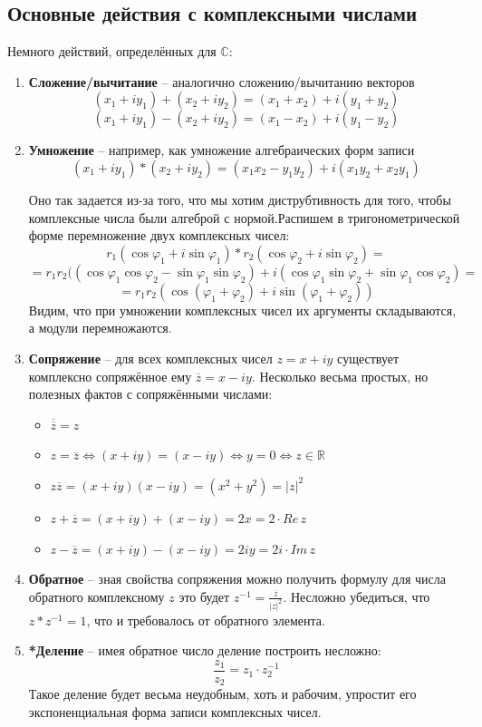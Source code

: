\documentclass[twoside]{book}
\begin{document}
\subsection{Основные действия с комплексными числами}
Немного действий, определённых для $\mathbb{C}$:
\begin{enumerate}
    \item \textbf{Сложение/вычитание} -- аналогично сложению/вычитанию векторов
          $$(x_1 + iy_1) + (x_2 + iy_2) = (x_1 + x_2) + i(y_1 + y_2)$$
          $$(x_1 + iy_1) - (x_2 + iy_2) = (x_1 - x_2) + i(y_1 - y_2)$$
    \item \textbf{Умножение} -- например, как умножение алгебраических форм записи
          $$(x_1 + iy_1) * (x_2 + iy_2) = (x_1x_2 - y_1y_2) + i(x_1y_2 + x_2y_1)$$

          Оно так задается из-за того, что мы хотим диструбтивность для того, чтобы комплексные числа были алгеброй с нормой.Распишем в тригонометрической форме перемножение двух комплексных чисел:
          $$r_1(\cos{\varphi_1}+i\sin{\varphi_1}) * r_2(\cos{\varphi_2}+i\sin{\varphi_2}) =$$
          $$=r_1r_2((\cos{\varphi_1}\cos{\varphi_2} - \sin{\varphi_1}\sin{\varphi_2}) + i(\cos{\varphi_1}\sin{\varphi_2} + \sin{\varphi_1}\cos{\varphi_2}) =$$
          $$=r_1r_2(\cos{(\varphi_1 + \varphi_2)} + i\sin{(\varphi_1 + \varphi_2)})$$
          Видим, что при умножении комплексных чисел их аргументы складываются, а модули перемножаются.
    \item \textbf{Сопряжение} -- для всех комплексных чисел $z=x+iy$ существует комплексно сопряжённое ему $\overline{z}=x-iy$. Несколько весьма простых, но полезных фактов с сопряжёнными числами:
          \begin{itemize}
              \item $\overline{\overline{z}} = z$
              \item $z=\overline{z} \Leftrightarrow (x+iy)=(x-iy) \Leftrightarrow y=0 \Leftrightarrow z\in \mathbb{R}$
              \item $z\overline{z}=(x + iy)(x - iy)=(x^2 + y^2)=|z|^2$
              \item $z+\overline{z}=(x + iy) + (x - iy)= 2x = 2 \cdot Re\,z$
              \item $z-\overline{z}=(x + iy) - (x - iy)= 2iy = 2i \cdot Im\,z$
          \end{itemize}
    \item \textbf{Обратное} -- зная свойства сопряжения можно получить формулу для числа обратного комплексному $z$ это будет $z^{-1}=\frac{\overline{z}}{|z|^2}$. Несложно убедиться, что $z*z^{-1}=1$, что и требовалось от обратного элемента.
    \item \textbf{*Деление} -- имея обратное число деление построить несложно:
          $$\frac{z_1}{z_2} = z_1 \cdot z_2^{-1}$$
          Такое деление будет весьма неудобным, хоть и рабочим, упростит его экспоненциальная форма записи комплексных чисел.
\end{enumerate}
\end{document}
